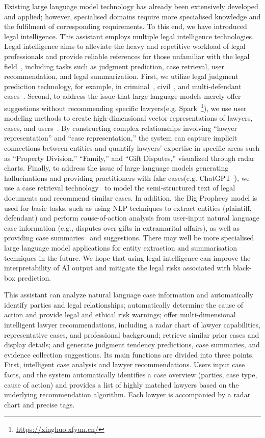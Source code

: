 \documentclass[conference]{IEEEtran}
\begin{document}
Existing large language model technology has already been extensively developed and applied; however, specialised domains require more specialised knowledge and the fulfilment of corresponding requirements. To this end, we have introduced legal intelligence.
This assistant employs multiple legal intelligence technologies. Legal intelligence aims to alleviate the heavy and repetitive workload of legal professionals and provide reliable references for those unfamiliar with the legal field~\cite{zhong2020does}, including tasks such as judgment prediction, case retrieval, user recommendation, and legal summarization. First, we utilize legal judgment prediction technology, for example, in criminal~\cite{yue2021neurjudge}, civil~\cite{zhao2022cpee}, and multi-defendant cases~\cite{huang2024cmdl}. Second, to address the issue that large language models merely offer suggestions without recommending specific lawyers(e.g. Spark~\footnote{\url{https://xinghuo.xfyun.cn/}}), we use user modeling methods to create high-dimensional vector representations of lawyers, cases, and users~\cite{an2021lawyerpan}. By constructing complex relationships involving ``lawyer representation'' and ``case representation,'' the system can capture implicit connections between entities and quantify lawyers' expertise in specific areas such as ``Property Division,'' ``Family,'' and ``Gift Disputes,'' visualized through radar charts. Finally, to address the issue of large language models generating hallucinations and providing practitioners with fake cases(e.g. ChatGPT~\cite{achiam2023gpt}), we use a case retrieval technology~\cite{li2023sailer} to model the semi-structured text of legal documents and recommend similar cases. In addition, the Big Prophecy model is used for basic tasks, such as using NLP techniques to extract entities (plaintiff, defendant) and perform cause-of-action analysis from user-input natural language case information (e.g., disputes over gifts in extramarital affairs), as well as providing case summaries~\cite{bhattacharya2019comparative} and suggestions. There may well be more specialised large language model applications for entity extraction and summarisation techniques in the future. We hope that using legal intelligence can improve the interpretability of AI output and mitigate the legal risks associated with black-box prediction.

This assistant can analyze natural language case information and automatically identify parties and legal relationships; automatically determine the cause of action and provide legal and ethical risk warnings; offer multi-dimensional intelligent lawyer recommendations, including a radar chart of lawyer capabilities, representative cases, and professional background; retrieve similar prior cases and display details; and generate judgment tendency predictions, case summaries, and evidence collection suggestions. Its main functions are divided into three points. First, intelligent case analysis and lawyer recommendations. Users input case facts, and the system automatically identifies a case overview (parties, case type, cause of action) and provides a list of highly matched lawyers based on the underlying recommendation algorithm. Each lawyer is accompanied by a radar chart and precise tags.
\end{document}
